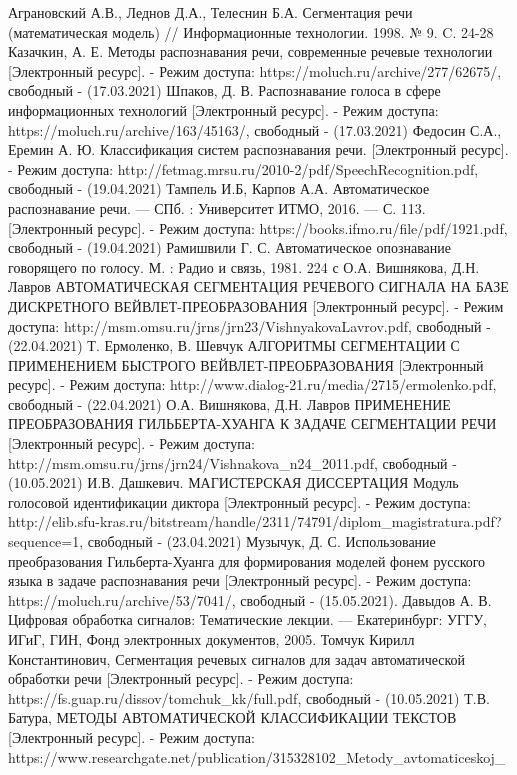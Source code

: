\documentclass[utf8x, 14pt, oneside, a4paper]{article}
\begin{document}
	\pagebreak
	
	
	\begin{thebibliography}{}
		Аграновский А.В., Леднов Д.А., Телеснин Б.А. Сегментация речи (математическая модель) // Информационные технологии. 1998. № 9. C. 24-28
		Казачкин, А. Е. Методы распознавания речи, современные речевые технологии [Электронный ресурс]. - Режим доступа: 
		https://moluch.ru/archive/277/62675/, свободный - (17.03.2021)
		Шпаков, Д. В. Распознавание голоса в сфере информационных технологий [Электронный ресурс]. - Режим доступа: https://moluch.ru/archive/163/45163/, свободный - (17.03.2021)
		Федосин С.А., Еремин А. Ю. Классификация систем распознавания речи. [Электронный ресурс]. - Режим доступа:
		http://fetmag.mrsu.ru/2010-2/pdf/SpeechRecognition.pdf, свободный - (19.04.2021)
		Тампель И.Б, Карпов А.А. Автоматическое распознавание речи. — СПб. : Университет ИТМО, 2016. — С. 113. [Электронный ресурс]. - Режим доступа: https://books.ifmo.ru/file/pdf/1921.pdf, свободный - (19.04.2021)
		Рамишвили Г. С. Автоматическое опознавание говорящего по голосу. М. : Радио и
		связь, 1981. 224 с
		О.А. Вишнякова, Д.Н. Лавров АВТОМАТИЧЕСКАЯ СЕГМЕНТАЦИЯ РЕЧЕВОГО СИГНАЛА НА БАЗЕ ДИСКРЕТНОГО ВЕЙВЛЕТ-ПРЕОБРАЗОВАНИЯ [Электронный ресурс]. - Режим доступа: http://msm.omsu.ru/jrns/jrn23/VishnyakovaLavrov.pdf, свободный - (22.04.2021)
		Т. Ермоленко, В. Шевчук АЛГОРИТМЫ СЕГМЕНТАЦИИ С ПРИМЕНЕНИЕМ
		БЫСТРОГО ВЕЙВЛЕТ-ПРЕОБРАЗОВАНИЯ [Электронный ресурс]. - Режим доступа: http://www.dialog-21.ru/media/2715/ermolenko.pdf, свободный - (22.04.2021)
		О.А. Вишнякова, Д.Н. Лавров ПРИМЕНЕНИЕ ПРЕОБРАЗОВАНИЯ
		ГИЛЬБЕРТА-ХУАНГА К ЗАДАЧЕ СЕГМЕНТАЦИИ РЕЧИ [Электронный ресурс]. - Режим доступа: http://msm.omsu.ru/jrns/jrn24/Vishnakova\_n24\_2011.pdf, свободный - (10.05.2021)
		И.В. Дашкевич. МАГИСТЕРСКАЯ ДИССЕРТАЦИЯ Модуль голосовой идентификации диктора [Электронный ресурс]. - Режим доступа: http://elib.sfu-kras.ru/bitstream/handle/2311/74791/diplom\_magistratura.pdf?sequence=1, свободный - (23.04.2021)
		Музычук, Д. С. Использование преобразования Гильберта-Хуанга для формирования моделей фонем русского языка в задаче распознавания речи [Электронный ресурс]. - Режим доступа: https://moluch.ru/archive/53/7041/, свободный - (15.05.2021).
		Давыдов А. В. Цифровая обработка сигналов: Тематические лекции. — Екатеринбург: УГГУ, ИГиГ, ГИН, Фонд электронных документов, 2005.
		Томчук Кирилл Константинович, Сегментация речевых сигналов
		для задач автоматической обработки речи [Электронный ресурс]. - Режим доступа: https://fs.guap.ru/dissov/tomchuk\_kk/full.pdf, свободный - (10.05.2021)
		Т.В. Батура, МЕТОДЫ АВТОМАТИЧЕСКОЙ КЛАССИФИКАЦИИ ТЕКСТОВ [Электронный ресурс]. - Режим доступа: https://www.researchgate.net/publication/315328102\_Metody\_avtomaticeskoj\_
		

\end{thebibliography}
\end{document}
